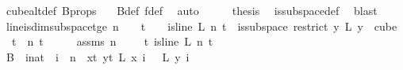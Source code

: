 \begin{isabellebody}
\ cube{}{\isacharunderscore}{\kern0pt}alt{\isacharunderscore}{\kern0pt}def\ B{\isacharunderscore}{\kern0pt}props\ {\isacharasterisk}{\kern0pt}\ \isamarkupfalse%
\ B{\isacharunderscore}{\kern0pt}def\ f{\isacharunderscore}{\kern0pt}def\ \isamarkupfalse%
\ auto\isanewline
\ \ \isamarkupfalse%
\ \isamarkupfalse%
\ {\isacharquery}{\kern0pt}thesis\ \isamarkupfalse%
\ is{\isacharunderscore}{\kern0pt}subspace{\isacharunderscore}{\kern0pt}def\ \isamarkupfalse%
\ blast\ \isanewline
{}\isamarkupfalse%
%
\endisatagproof
{\isafoldproof}%
%
\isadelimproof
\isanewline
%
\endisadelimproof
\isanewline
{}\isamarkupfalse%
\ line{\isacharunderscore}{\kern0pt}is{\isacharunderscore}{\kern0pt}dim{}{\isacharunderscore}{\kern0pt}subspace{\isacharunderscore}{\kern0pt}t{\isacharunderscore}{\kern0pt}ge{\isacharunderscore}{\kern0pt}{}{\isacharcolon}{\kern0pt}\ {\isachardoublequoteopen}n\ {\isachargreater}{\kern0pt}\ {}\ {\isasymLongrightarrow}\ t\ {\isachargreater}{\kern0pt}\ {}\ {\isasymLongrightarrow}\ is{\isacharunderscore}{\kern0pt}line\ L\ n\ t\ {\isasymLongrightarrow}\ is{\isacharunderscore}{\kern0pt}subspace\ {\isacharparenleft}{\kern0pt}restrict\ {\isacharparenleft}{\kern0pt}{\isasymlambda}y{\isachardot}{\kern0pt}\ L\ {\isacharparenleft}{\kern0pt}y\ {}{\isacharparenright}{\kern0pt}{\isacharparenright}{\kern0pt}\ {\isacharparenleft}{\kern0pt}cube\ {}\ t{\isacharparenright}{\kern0pt}{\isacharparenright}{\kern0pt}\ {}\ n\ t{\isachardoublequoteclose}\isanewline
%
\isadelimproof
%
\endisadelimproof
%
\isatagproof
{}\isamarkupfalse%
\ {\isacharminus}{\kern0pt}\isanewline
\ \ \isamarkupfalse%
\ assms{\isacharcolon}{\kern0pt}\ {\isachardoublequoteopen}n\ {\isachargreater}{\kern0pt}\ {}{\isachardoublequoteclose}\ {\isachardoublequoteopen}{}\ {\isacharless}{\kern0pt}\ t{\isachardoublequoteclose}\ {\isachardoublequoteopen}is{\isacharunderscore}{\kern0pt}line\ L\ n\ t{\isachardoublequoteclose}\isanewline
\ \ \isamarkupfalse%
\ {\isacharquery}{\kern0pt}B{}\ {\isacharequal}{\kern0pt}\ {\isachardoublequoteopen}{\isacharbraceleft}{\kern0pt}i{\isacharcolon}{\kern0pt}{\isacharcolon}{\kern0pt}nat\ {\isachardot}{\kern0pt}\ i\ {\isacharless}{\kern0pt}\ n\ {\isasymand}\ {\isacharparenleft}{\kern0pt}{\isasymforall}x{\isacharless}{\kern0pt}t{\isachardot}{\kern0pt}\ {\isasymforall}y{\isacharless}{\kern0pt}t{\isachardot}{\kern0pt}\ L\ x\ i\ {\isacharequal}{\kern0pt}\ \ L\ y\ i{\isacharparenright}{\kern0pt}{\isacharbraceright}{\kern0pt}{\isachardoublequoteclose}\isanewline

\end{isabellebody}

